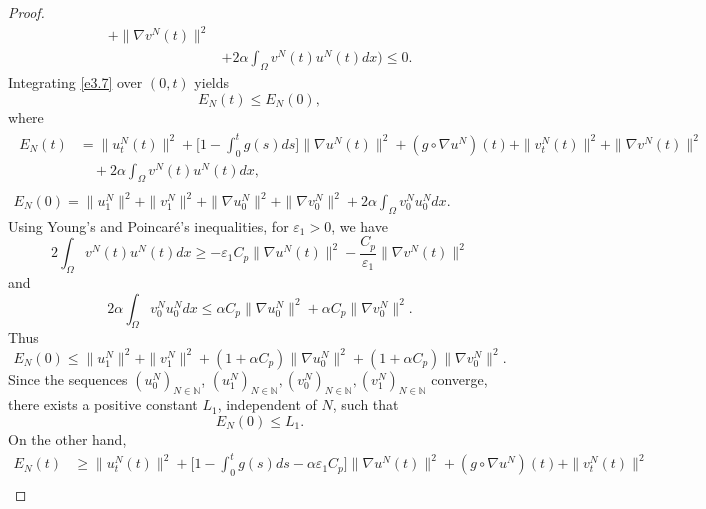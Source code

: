 \begin{proof}
\begin{equation}
\begin{aligned}
 + \| \nabla v^N (t)\|^2 \\
&+ 2 \alpha \int_{\Omega} v^N(t) u^N(t) dx\Big)\leq 0.
\end{aligned} \label{e3.7}
\end{equation}
Integrating \eqref{e3.7} over $(0, t)$ yields
\begin{equation}
 E_N(t)\leq E_N(0), \label{e3.8}
\end{equation}
where
 \begin{gather*}
 \begin{aligned}
E_N(t)&=\| u^N_{t} (t) \|^2 + \Big[ 1-\int_0^t g(s)ds\Big] \| \nabla u^N(t) \|^2 +(g\circ\nabla u^N)(t)
 +\| v^N_{t}(t) \|^2 + \| \nabla v^N(t) \|^2\\
&\quad + 2 \alpha \int_{\Omega} v^N(t) u^N(t) dx,
\end{aligned}\\
E_N(0)= \| u^N_{1} \|^2 + \| v^N_{1} \|^2 +\| \nabla u^N_0 \|^2
 +\| \nabla v^N_0 \|^2+ 2 \alpha \int_{\Omega} v^N_0 u^N_0 dx.
\end{gather*}
Using Young's and Poincar\'e's inequalities, for $\varepsilon_{1}> 0$, we have
 \begin{equation}
 2\int_{\Omega} v^N(t) u^N(t) dx\geq - \varepsilon_{1} C_p\| \nabla u^N (t) \|^2 - \frac{C_p}{\varepsilon_{1}} \| \nabla v^N (t) \|^2
 \label{e3.9}
 \end{equation}
and
 \begin{equation}
 2 \alpha \int_{\Omega} v^N_0 u^N_0 dx\leq \alpha C_p\| \nabla u^N_0 \|^2 + \alpha C_p \| \nabla v^N_0 \|^2.
 \label{e3.10}
 \end{equation}
Thus
\begin{equation}
 E_N(0)\leq \| u^N_{1} \|^2 + \| v^N_{1} \|^2 +(1+\alpha C_p)\| \nabla u^N_0 \|^2 +(1+\alpha C_p)\| \nabla v^N_0 \|^2.\label{e3.11}
 \end{equation}
Since the sequences $ (u_0^N)_{N \in \mathbb{N}}$,
$ (u_1^N)_{N \in \mathbb{N}}, (v_0^N)_{N \in \mathbb{N}}, (v_1^N)_{N \in \mathbb{N}} $ converge, there exists a positive constant $L_{1}$, independent of $N$, such that
\begin{equation}
E_N(0)\leq L_{1}.\label{e3.12}
\end{equation}
On the other hand,
\begin{equation}
\begin{aligned}
E_N(t)
&\geq \| u^N_{t}(t) \|^2 + \Big[ 1-\int_0^t g(s)ds -\alpha \varepsilon_{1} C_p \Big]
 \| \nabla u^N(t) \|^2 +(g\circ\nabla u^N)(t)+\| v^N_{t} (t) \|^2 \\

\end{aligned}
\end{equation}
\end{proof}
